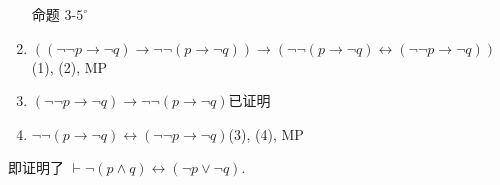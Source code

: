 \documentclass[boxes]{homework}
\begin{document}
\begin{solution}
\begin{enumerate}[label = (\arabic*), itemsep = 0em, topsep = .5em, partopsep = .5em]
        \hfill 命题 3-$5^\circ$
        \item $((\lnot\lnot p\to\lnot q)\to \lnot\lnot (p\to \lnot q))\to (\lnot\lnot (p\to \lnot q)\leftrightarrow(\lnot\lnot p\to\lnot q))$\hfill (1), (2), MP
        \item $(\lnot\lnot p\to \lnot q)\to\lnot\lnot (p\to\lnot q)$\hfill 已证明
        \item $\lnot\lnot (p\to \lnot q)\leftrightarrow(\lnot\lnot p\to\lnot q)$\hfill (3), (4), MP
    \end{enumerate}
    即证明了 $\vdash \lnot (p\land q) \leftrightarrow (\lnot p\lor \lnot q)$.
\end{solution}
\end{document}
